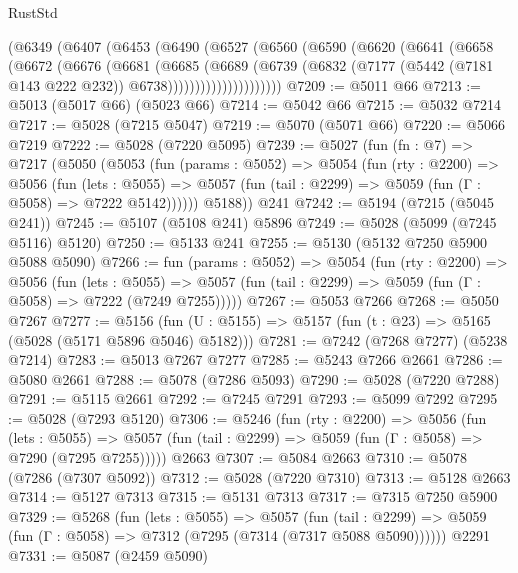 \begin{lexlean}{RustStd}
\begin{coremodule}
{\begin{coremodule}
{{{{{{{{{{{{          (@6349
            (@6407
              (@6453
                (@6490
                  (@6527
                    (@6560
                      (@6590
                        (@6620
                          (@6641
                            (@6658
                              (@6672
                                (@6676
                                  (@6681
                                    (@6685
                                      (@6689
                                        (@6739
                                          (@6832
                                            (@7177
                                              (@5442 (@7181 @143 @222 @232))
                                              @6738)))))))))))))))))))))
@7209 := @5011 @66
@7213 := @5013 (@5017 @66) (@5023 @66)
@7214 := @5042 @66
@7215 := @5032 @7214
@7217 := @5028 (@7215 @5047)
@7219 := @5070 (@5071 @66)
@7220 := @5066 @7219
@7222 := @5028 (@7220 @5095)
@7239 := @5027
    (fun (fn : @7) =>
    @7217
      (@5050
        (@5053
          (fun (params : @5052) =>
          @5054
            (fun (rty : @2200) =>
            @5056
              (fun (lets : @5055) =>
              @5057 (fun (tail : @2299) => @5059 (fun (Γ : @5058) => @7222 @5142))))))
        @5188))
    @241
@7242 := @5194 (@7215 (@5045 @241))
@7245 := @5107 (@5108 @241) @5896
@7249 := @5028 (@5099 (@7245 @5116) @5120)
@7250 := @5133 @241
@7255 := @5130 (@5132 @7250 @5900 @5088 @5090)
@7266 := fun (params : @5052) =>
  @5054
    (fun (rty : @2200) =>
    @5056
      (fun (lets : @5055) =>
      @5057 (fun (tail : @2299) => @5059 (fun (Γ : @5058) => @7222 (@7249 @7255)))))
@7267 := @5053 @7266
@7268 := @5050 @7267
@7277 := @5156 (fun (U : @5155) => @5157 (fun (t : @23) => @5165 (@5028 (@5171 @5896 @5046) @5182)))
@7281 := @7242 (@7268 @7277) (@5238 @7214)
@7283 := @5013 @7267 @7277
@7285 := @5243 @7266 @2661
@7286 := @5080 @2661
@7288 := @5078 (@7286 @5093)
@7290 := @5028 (@7220 @7288)
@7291 := @5115 @2661
@7292 := @7245 @7291
@7293 := @5099 @7292
@7295 := @5028 (@7293 @5120)
@7306 := @5246
    (fun (rty : @2200) =>
    @5056
      (fun (lets : @5055) =>
      @5057 (fun (tail : @2299) => @5059 (fun (Γ : @5058) => @7290 (@7295 @7255)))))
    @2663
@7307 := @5084 @2663
@7310 := @5078 (@7286 (@7307 @5092))
@7312 := @5028 (@7220 @7310)
@7313 := @5128 @2663
@7314 := @5127 @7313
@7315 := @5131 @7313
@7317 := @7315 @7250 @5900
@7329 := @5268
    (fun (lets : @5055) =>
    @5057
      (fun (tail : @2299) => @5059 (fun (Γ : @5058) => @7312 (@7295 (@7314 (@7317 @5088 @5090))))))
    @2291
@7331 := @5087 (@2459 @5090)
}}}}}}}}}}}}
\end{coremodule}}
\end{coremodule}
\end{lexlean}
